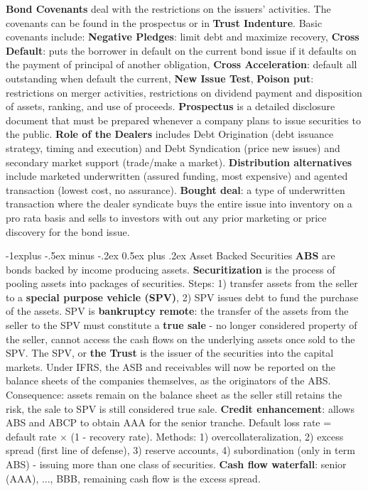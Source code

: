 \documentclass[10pt,landscape]{article}
\makeatletter
\renewcommand{\subsection}{\@startsection{subsection}{2}{0mm}%
                                {-1explus -.5ex minus -.2ex}%
                                {0.5ex plus .2ex}%
                                {\normalfont\normalsize\bfseries}}
\makeatother
\begin{document}
\begin{multicols}{3}
{\bf Bond Covenants} deal with the restrictions on the issuers' activities. The covenants can be found in the prospectus or in {\bf Trust Indenture}. Basic covenants include: {\bf Negative Pledges}: limit debt and maximize recovery, {\bf Cross Default}: puts the borrower in default on the current bond issue if it defaults on the payment of principal of another obligation, {\bf Cross Acceleration}: default all outstanding when default the current, {\bf New Issue Test}, {\bf Poison put}: restrictions on merger activities, restrictions on dividend payment and disposition of assets, ranking, and use of proceeds. {\bf Prospectus} is a detailed disclosure document that must be prepared whenever a company plans to issue securities to the public. {\bf Role of the Dealers} includes Debt Origination (debt issuance strategy, timing and execution) and Debt Syndication (price new issues) and secondary market support (trade/make a market). {\bf Distribution alternatives} include marketed underwritten (assured funding, most expensive) and agented transaction (lowest cost, no assurance). {\bf Bought deal}: a type of underwritten transaction where the dealer syndicate buys the entire issue into inventory on a pro rata basis and sells to investors with out any prior marketing or price discovery for the bond issue.

\subsection{Asset Backed Securities}
{\bf ABS} are bonds backed by income producing assets. {\bf Securitization} is the process of pooling assets into packages of securities. Steps: 1) transfer assets from the seller to a {\bf special purpose vehicle (SPV)}, 2) SPV issues debt to fund the purchase of the assets. SPV is {\bf bankruptcy remote}: the transfer of the assets from the seller to the SPV must constitute a {\bf true sale} - no longer considered property of the seller, cannot access the cash flows on the underlying assets once sold to the SPV. The SPV, or {\bf the Trust} is the issuer of the securities into the capital markets. Under IFRS, the ASB and receivables will now be reported on the balance sheets of the companies themselves, as the originators of the ABS. Consequence: assets remain on the balance sheet as the seller still retains the risk, the sale to SPV is still considered true sale. {\bf Credit enhancement}: allows ABS and ABCP to obtain AAA for the senior tranche. Default loss rate = default rate $\times$ (1 - recovery rate). Methods: 1) overcollateralization, 2) excess spread (first line of defense), 3) reserve accounts, 4) subordination (only in term ABS) - issuing more than one class of securities. {\bf Cash flow waterfall}: senior (AAA), ..., BBB, remaining cash flow is the excess spread.


\end{multicols}
\end{document}
